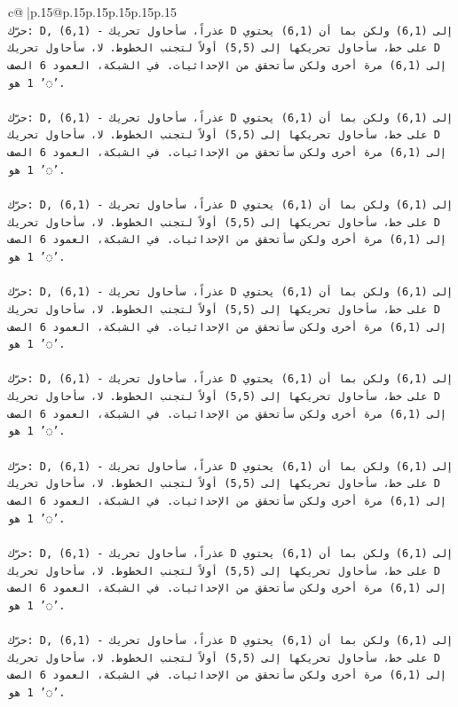 \documentclass{article}
\begin{document}
{\begin{supertabular}{c@{$\;$}|p{.15\linewidth}@{}p{.15\linewidth}p{.15\linewidth}p{.15\linewidth}p{.15\linewidth}p{.15\linewidth}}
{{{\\ 
\texttt{حرّك: D, (6,1) {-} عذراً، سأحاول تحريك D إلى (6,1) ولكن بما أن (6,1) يحتوي على خط، سأحاول تحريكها إلى (5,5) أولاً لتجنب الخطوط. لا، سأحاول تحريك D إلى (6,1) مرة أخرى ولكن سأتحقق من الإحداثيات. في الشبكة، العمود 6 الصف 1 هو '◌'.} \\
\\ 
\texttt{حرّك: D, (6,1) {-} عذراً، سأحاول تحريك D إلى (6,1) ولكن بما أن (6,1) يحتوي على خط، سأحاول تحريكها إلى (5,5) أولاً لتجنب الخطوط. لا، سأحاول تحريك D إلى (6,1) مرة أخرى ولكن سأتحقق من الإحداثيات. في الشبكة، العمود 6 الصف 1 هو '◌'.} \\
\\ 
\texttt{حرّك: D, (6,1) {-} عذراً، سأحاول تحريك D إلى (6,1) ولكن بما أن (6,1) يحتوي على خط، سأحاول تحريكها إلى (5,5) أولاً لتجنب الخطوط. لا، سأحاول تحريك D إلى (6,1) مرة أخرى ولكن سأتحقق من الإحداثيات. في الشبكة، العمود 6 الصف 1 هو '◌'.} \\
\\ 
\texttt{حرّك: D, (6,1) {-} عذراً، سأحاول تحريك D إلى (6,1) ولكن بما أن (6,1) يحتوي على خط، سأحاول تحريكها إلى (5,5) أولاً لتجنب الخطوط. لا، سأحاول تحريك D إلى (6,1) مرة أخرى ولكن سأتحقق من الإحداثيات. في الشبكة، العمود 6 الصف 1 هو '◌'.} \\
\\ 
\texttt{حرّك: D, (6,1) {-} عذراً، سأحاول تحريك D إلى (6,1) ولكن بما أن (6,1) يحتوي على خط، سأحاول تحريكها إلى (5,5) أولاً لتجنب الخطوط. لا، سأحاول تحريك D إلى (6,1) مرة أخرى ولكن سأتحقق من الإحداثيات. في الشبكة، العمود 6 الصف 1 هو '◌'.} \\
\\ 
\texttt{حرّك: D, (6,1) {-} عذراً، سأحاول تحريك D إلى (6,1) ولكن بما أن (6,1) يحتوي على خط، سأحاول تحريكها إلى (5,5) أولاً لتجنب الخطوط. لا، سأحاول تحريك D إلى (6,1) مرة أخرى ولكن سأتحقق من الإحداثيات. في الشبكة، العمود 6 الصف 1 هو '◌'.} \\
\\ 
\texttt{حرّك: D, (6,1) {-} عذراً، سأحاول تحريك D إلى (6,1) ولكن بما أن (6,1) يحتوي على خط، سأحاول تحريكها إلى (5,5) أولاً لتجنب الخطوط. لا، سأحاول تحريك D إلى (6,1) مرة أخرى ولكن سأتحقق من الإحداثيات. في الشبكة، العمود 6 الصف 1 هو '◌'.} \\
\\ 
\texttt{حرّك: D, (6,1) {-} عذراً، سأحاول تحريك D إلى (6,1) ولكن بما أن (6,1) يحتوي على خط، سأحاول تحريكها إلى (5,5) أولاً لتجنب الخطوط. لا، سأحاول تحريك D إلى (6,1) مرة أخرى ولكن سأتحقق من الإحداثيات. في الشبكة، العمود 6 الصف 1 هو '◌'.} \\
\\ 
}}}
\end{supertabular}}
\end{document}
